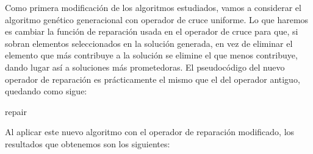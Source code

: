 \documentclass[10pt,a4paper]{article}
\begin{document}
Como primera modificación de los algoritmos estudiados, vamos a considerar el algoritmo genético generacional con operador de cruce uniforme. Lo que haremos es cambiar la función de reparación usada en el operador de cruce para que, si sobran elementos seleccionados en la solución generada, en vez de eliminar el elemento que más contribuye a la solución se elimine el que menos contribuye, dando lugar así a soluciones más prometedoras. El pseudocódigo del nuevo operador de reparación es prácticamente el mismo que el del operador antiguo, quedando como sigue: 

\begin{algorithm}[H]
	\caption{ \sc repair}
\end{algorithm}

Al aplicar este nuevo algoritmo con el operador de reparación modificado, los resultados que obtenemos son los siguientes: 
 
\end{document}
